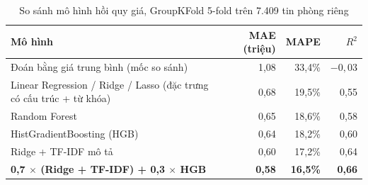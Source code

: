 \documentclass[11pt,a4paper]{article}
\begin{document}
\begin{table}[h]
\centering\small
\caption{So sánh mô hình hồi quy giá, GroupKFold 5-fold trên 7.409 tin phòng riêng}
\begin{tabular}{@{}lrrr@{}}
\toprule
Mô hình & MAE (triệu) & MAPE & $R^2$ \\
\midrule
Đoán bằng giá trung bình (mốc so sánh) & 1,08 & 33,4\% & $-0{,}03$ \\
Linear Regression / Ridge / Lasso (đặc trưng có cấu trúc + từ khóa) & 0,68 & 19,5\% & 0,55 \\
Random Forest & 0,65 & 18,6\% & 0,58 \\
HistGradientBoosting (HGB) & 0,64 & 18,2\% & 0,60 \\
Ridge + TF-IDF mô tả & 0,60 & 17,2\% & 0,64 \\
\textbf{0,7 $\times$ (Ridge + TF-IDF) + 0,3 $\times$ HGB} & \textbf{0,58} & \textbf{16,5\%} & \textbf{0,66} \\
\bottomrule
\end{tabular}
\end{table}
\vspace{-8pt}
\end{document}
